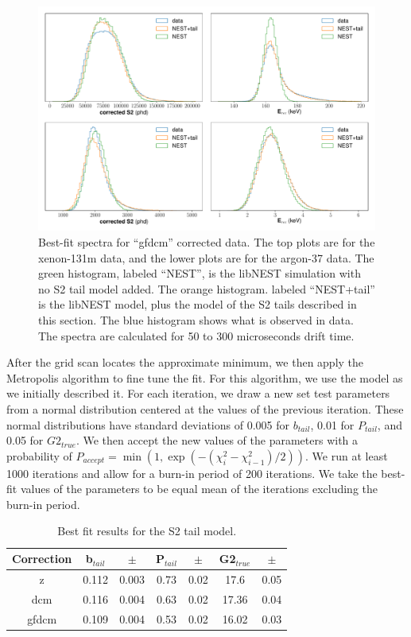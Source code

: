 \begin{figure}[h!]
  \centering
  \includegraphics[width=\textwidth]{Figures/S2tail_hists_gfdcm.pdf}
\caption{Best-fit spectra for ``gfdcm'' corrected data. The top plots are for the xenon-131m data, and the lower plots are for the argon-37 data. The green histogram, labeled ``NEST'', is the libNEST simulation with no S2 tail model added. The orange histogram. labeled ``NEST+tail'' is the libNEST model, plus the model of the S2 tails described in this section. The blue histogram shows what is observed in data. The spectra are calculated for 50 to 300 microseconds drift time.  }
\label{fig:s2bestfit_spec_gfdcm}
\end{figure}

After the grid scan locates the approximate minimum, we then apply the Metropolis algorithm to fine tune the fit\cite{metropolis_1,metropolis_2}. For this algorithm, we use the model as we initially described it. For each iteration, we draw a new set test parameters from a normal distribution centered at the values of the previous iteration. These normal distributions have standard deviations of  0.005 for $b_{tail}$, 0.01 for $P_{tail}$, and 0.05 for $G2_{true}$. We then accept the new values of the parameters with a probability of $P_{accept}=\min(1,\exp(-(\chi_i^2-\chi_{i-1}^2)/2))$. We run at least 1000 iterations and allow for a burn-in period of 200 iterations. We take the best-fit values of the parameters to be equal mean of the iterations excluding the burn-in period.

\begin{table}[h!]
\centering
    \begin{tabular}{ c | c | c | c | c | c | c }
    \hline
    Correction & b$_{tail}$ & $\pm$ & P$_{tail}$ & $\pm$  & G2$_{true}$ & $\pm$ \\
    \hline \hline
    z & 0.112 & 0.003 & 0.73 & 0.02 & 17.6 & 0.05\\
    \hline
    dcm & 0.116 & 0.004 & 0.63 & 0.02 & 17.36 & 0.04 \\
    \hline
    gfdcm & 0.109 & 0.004 & 0.53 & 0.02 & 16.02 & 0.03 \\
    \hline
    \end{tabular}
    \caption{Best fit results for the S2 tail model.}
    \label{tab:s2bestfit}
\end{table}

